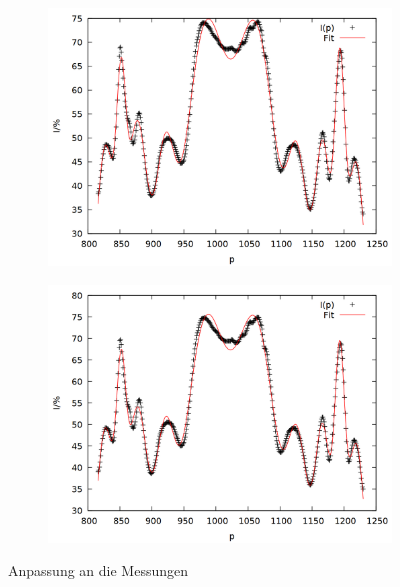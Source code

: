 \begin{figure}\ContinuedFloat
\begin{subfigure}{0.45\textwidth}
\includegraphics[width=\textwidth]{data/zeeman/out_8_4.png}
\end{subfigure}
\begin{subfigure}{0.45\textwidth}
\includegraphics[width=\textwidth]{data/zeeman/out_8_5.png}
\end{subfigure}
\caption{Anpassung an die Messungen}
\label{fig:raw_fit}
\end{figure}

